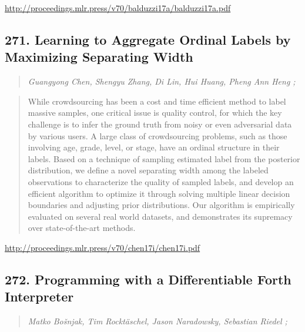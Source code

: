 \documentclass{article}
\begin{document}
\href{http://proceedings.mlr.press/v70/balduzzi17a/balduzzi17a.pdf}{http://proceedings.mlr.press/v70/balduzzi17a/balduzzi17a.pdf}

\subsection{271. Learning to Aggregate Ordinal Labels by Maximizing Separating Width}

\begin{quote}
\footnotesize{\textit{Guangyong Chen, Shengyu Zhang, Di Lin, Hui Huang, Pheng Ann Heng ;}}
\end{quote}

\begin{quote}
    While crowdsourcing has been a cost and time efficient method to label massive samples, one critical issue is quality control, for which the key challenge is to infer the ground truth from noisy or even adversarial data by various users. A large class of crowdsourcing problems, such as those involving age, grade, level, or stage, have an ordinal structure in their labels. Based on a technique of sampling estimated label from the posterior distribution, we define a novel separating width among the labeled observations to characterize the quality of sampled labels, and develop an efficient algorithm to optimize it through solving multiple linear decision boundaries and adjusting prior distributions. Our algorithm is empirically evaluated on several real world datasets, and demonstrates its supremacy over state-of-the-art methods.  \end{quote}

\href{http://proceedings.mlr.press/v70/chen17i/chen17i.pdf}{http://proceedings.mlr.press/v70/chen17i/chen17i.pdf}

\subsection{272. Programming with a Differentiable Forth Interpreter}

\begin{quote}
\footnotesize{\textit{Matko Bošnjak, Tim Rocktäschel, Jason Naradowsky, Sebastian Riedel ;}}
\end{quote}
\end{document}
